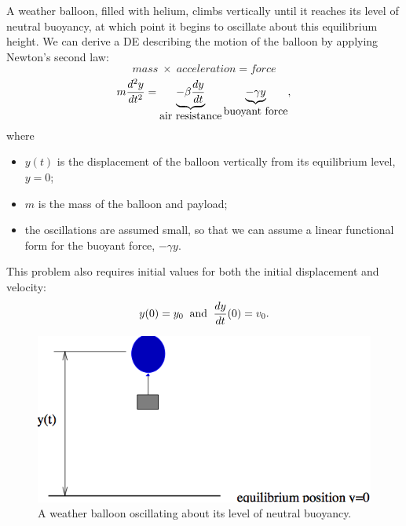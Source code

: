 \begin{example}
  \label{lab1:exm:balloon}
  A weather balloon, filled with helium, climbs vertically until it
  reaches its level of neutral buoyancy, at which point it begins to
  oscillate about this equilibrium height.  We can derive a DE
  describing the motion of the balloon by applying Newton's second
  law:  
  \[
    mass \; \times \; acceleration = force 
  \]
  \[
    m \frac{d^2 y}{d t^2} = 
      \underbrace{- \beta \frac{dy}{dt}}_{\mbox{\rm air resistance}} 
      \underbrace{- \gamma y}_{\mbox{\rm buoyant force}},
  \]
  where
  \begin{itemize}
  \item[\ ] $y(t)$ is the displacement of the balloon vertically from
    its equilibrium level, $y=0$; 
  \item[\ ] $m$ is the mass of the balloon and payload;
  \item[\ ] the oscillations are assumed small, so that we can
    assume a linear functional form for the buoyant force, 
    $-\gamma y$.
  \end{itemize}
  This problem also requires initial values for both the initial
  displacement and velocity:
  \[ 
    y(0) = y_0 \;\; \mbox{\rm and} \;\; \frac{dy}{dt}(0) = v_0.
  \]

  \begin{figure}[htbp]
    \begin{center}
      \leavevmode
      \includegraphics{balloon/balloon}
      \caption{A weather balloon oscillating about its level of
        neutral buoyancy.}
      \label{lab1:fig:balloon}
    \end{center}
  \end{figure}
\end{example}

